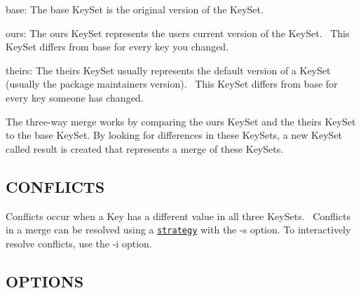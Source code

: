\begin{DoxyItemize}
\item {\ttfamily base}\+: The {\ttfamily base} Key\+Set is the original version of the Key\+Set.~\newline

\item {\ttfamily ours}\+: The {\ttfamily ours} Key\+Set represents the user\textquotesingle{}s current version of the Key\+Set.~\newline
 This Key\+Set differs from {\ttfamily base} for every key you changed.~\newline

\item {\ttfamily theirs}\+: The {\ttfamily theirs} Key\+Set usually represents the default version of a Key\+Set (usually the package maintainer\textquotesingle{}s version).~\newline
 This Key\+Set differs from {\ttfamily base} for every key someone has changed.~\newline

\end{DoxyItemize}

The three-\/way merge works by comparing the {\ttfamily ours} Key\+Set and the {\ttfamily theirs} Key\+Set to the {\ttfamily base} Key\+Set. By looking for differences in these Key\+Sets, a new Key\+Set called {\ttfamily result} is created that represents a merge of these Key\+Sets.~\newline


\subsection*{C\+O\+N\+F\+L\+I\+C\+TS}

Conflicts occur when a Key has a different value in all three Key\+Sets.~\newline
 Conflicts in a merge can be resolved using a \href{#STRATEGIES}{\tt strategy} with the {\ttfamily -\/s} option. To interactively resolve conflicts, use the {\ttfamily -\/i} option.

\subsection*{O\+P\+T\+I\+O\+NS}


